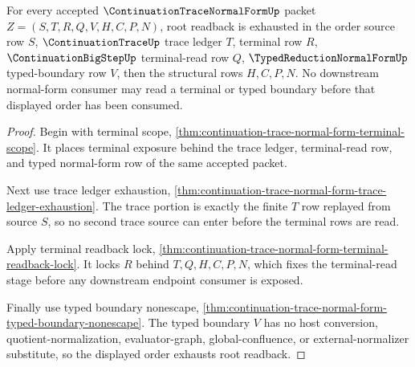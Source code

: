\begin{theorem}
\label{thm:continuation-trace-normal-form-root-readback-order-exhaustion}
For every accepted $\ContinuationTraceNormalFormUp$ packet $Z=(S,T,R,Q,V,H,C,P,N)$, root readback is exhausted in the order source row $S$, $\ContinuationTraceUp$ trace ledger $T$, terminal row $R$, $\ContinuationBigStepUp$ terminal-read row $Q$, $\TypedReductionNormalFormUp$ typed-boundary row $V$, then the structural rows $H,C,P,N$. No downstream normal-form consumer may read a terminal or typed boundary before that displayed order has been consumed.
\end{theorem}
\begin{proof}
Begin with terminal scope, \autoref{thm:continuation-trace-normal-form-terminal-scope}. It places terminal exposure behind the trace ledger, terminal-read row, and typed normal-form row of the same accepted packet.

Next use trace ledger exhaustion, \autoref{thm:continuation-trace-normal-form-trace-ledger-exhaustion}. The trace portion is exactly the finite $T$ row replayed from source $S$, so no second trace source can enter before the terminal rows are read.

Apply terminal readback lock, \autoref{thm:continuation-trace-normal-form-terminal-readback-lock}. It locks $R$ behind $T,Q,H,C,P,N$, which fixes the terminal-read stage before any downstream endpoint consumer is exposed.

Finally use typed boundary nonescape, \autoref{thm:continuation-trace-normal-form-typed-boundary-nonescape}. The typed boundary $V$ has no host conversion, quotient-normalization, evaluator-graph, global-confluence, or external-normalizer substitute, so the displayed order exhausts root readback.
\end{proof}

